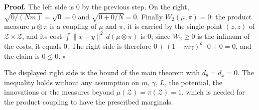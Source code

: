 \documentclass[11pt,a4paper]{article}
\begin{document}
\textbf{Proof.} The left side is \(0\) by the previous step. On the right, \(\sqrt{0/(Nm)}=\sqrt0=0\) and \(\sqrt{0+0/N}=0\). Finally \(W_2(\mu,\pi)=0\): the product measure \(\mu\otimes\pi\) is a coupling of \(\mu\) and \(\pi\), it is carried by the single point \((z,z)\) of \(\mathcal Z\times\mathcal Z\), and its cost \(\int\|x-y\|^2\,d(\mu\otimes\pi)\) is \(0\); since \(W_2\ge0\) is the infimum of the costs, it equals \(0\). The right side is therefore \(0+(1-m\gamma)^k\cdot0+0=0\), and the claim is \(0\le0\). \(\square\)




The displayed right side is the bound of the main theorem with \(d_\theta=d_x=0\). The inequality holds without any assumption on \(m\), \(\gamma\), \(L\), the potential, the innovations or the measures beyond \(\mu(\mathcal Z)=\pi(\mathcal Z)=1\), which is needed for the product coupling to have the prescribed marginals.
\end{document}
